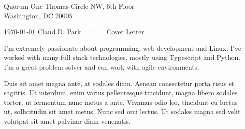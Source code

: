 


\recipient
  {Quorum}
  {One Thomas Circle NW, 6th Floor\\
  Washington, DC 20005 }




\makecvheader[R]

\makecvfooter
  {\today}
  {Claud D. Park~~~·~~~Cover Letter}
  {}

\makelettertitle

\begin{cvletter}

I'm extremely passionate about programming, web development
and Linux.
I've worked with many full stack technologies, mostly using
Typescript and Python.
I'm a great problem solver and can work with agile
environments.

Duis sit amet magna ante, at sodales diam. Aenean consectetur porta risus et sagittis. Ut interdum, enim varius pellentesque tincidunt, magna libero sodales tortor, ut fermentum nunc metus a ante. Vivamus odio leo, tincidunt eu luctus ut, sollicitudin sit amet metus. Nunc sed orci lectus. Ut sodales magna sed velit volutpat sit amet pulvinar diam venenatis.

\end{cvletter}


\makeletterclosing


